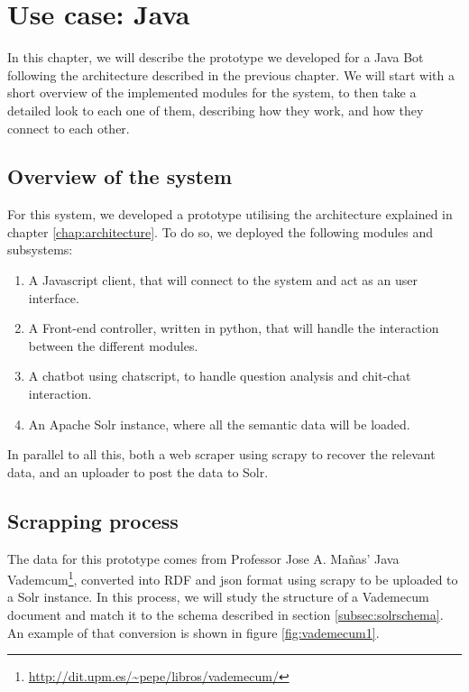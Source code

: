 \chapter{Use case: Java}
\label{chap:usecasejava}

\begin{chapterintro}

In this chapter, we will describe the prototype we developed for a Java Bot following the architecture described in the previous chapter. We will start with a short overview of the implemented modules for the system, to then take a detailed look to each one of them, describing how they work, and how they connect to each other.
 
\end{chapterintro}

\cleardoublepage

\section{Overview of the system}

For this system, we developed a prototype utilising the architecture explained in chapter \ref{chap:architecture}. To do so, we deployed the following modules and subsystems:

\begin{enumerate}
 \item A Javascript client, that will connect to the system and act as an user interface.
 \item A Front-end controller, written in python, that will handle the interaction between the different modules.
 \item A chatbot using chatscript, to handle question analysis and chit-chat interaction.
 \item An Apache Solr instance, where all the semantic data will be loaded.
\end{enumerate}

In parallel to all this, both a web scraper using scrapy to recover the relevant data, and an uploader to post the data to Solr.

\section{Scrapping process}

The data for this prototype comes from Professor Jose A. Mañas' Java Vademcum\footnote{\url{http://dit.upm.es/~pepe/libros/vademecum/}}, converted into RDF and json format using scrapy to be uploaded to a Solr instance. In this process, we will study the structure of a Vademecum document and match it to the schema described in section \ref{subsec:solrschema}. An example of that conversion is shown in figure \ref{fig:vademecum1}.

